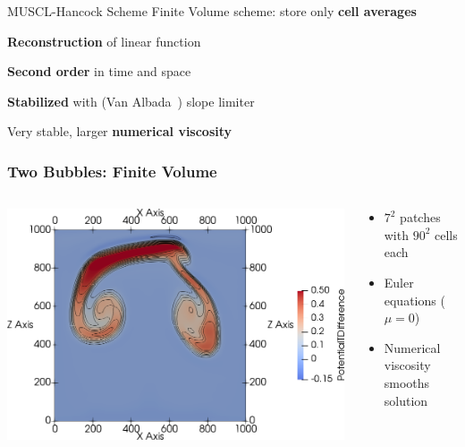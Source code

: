 \documentclass[aspectratio=169]{beamer}
\begin{document}
\begin{frame}{MUSCL-Hancock Scheme}
  Finite Volume scheme: store only \textbf{cell averages}

  \textbf{Reconstruction} of linear function

  \textbf{Second order} in time and space

  \textbf{Stabilized} with (Van Albada~) slope limiter

  Very stable, larger \textbf{numerical viscosity}
\end{frame}

\begin{frame}
  \frametitle{Two Bubbles: Finite Volume}
  \begin{columns}
    \begin{column}{0.6\textwidth}
  \begin{center}
    \includegraphics[width=1.0\textwidth]{paper_two_bubbles_fv}
  \end{center}
    \end{column}
    \begin{column}{0.4\textwidth}
      \begin{itemize}
      \item $7^2$ patches with $90^2$ cells each
      \item Euler equations ($\mu = 0$)
      \item Numerical viscosity smooths solution
      \end{itemize}
    \end{column}
  \end{columns}
\end{frame}
\end{document}
